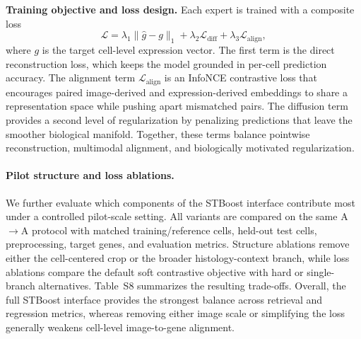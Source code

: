 \documentclass[sigconf,review]{acmart}
\begin{document}
\noindent\textbf{Training objective and loss design.}
Each expert is trained with a composite loss
\begin{equation}
\mathcal{L}=\lambda_1\|\hat{g}-g\|_1 + \lambda_2\mathcal{L}_{\mathrm{diff}} + \lambda_3\mathcal{L}_{\mathrm{align}},
\end{equation}
where $g$ is the target cell-level expression vector. The first term is the direct reconstruction loss, which keeps the model grounded in per-cell prediction accuracy. The alignment term $\mathcal{L}_{\mathrm{align}}$ is an InfoNCE contrastive loss that encourages paired image-derived and expression-derived embeddings to share a representation space while pushing apart mismatched pairs. The diffusion term provides a second level of regularization by penalizing predictions that leave the smoother biological manifold. Together, these terms balance pointwise reconstruction, multimodal alignment, and biologically motivated regularization.

\paragraph{Pilot structure and loss ablations.}
We further evaluate which components of the STBoost interface contribute most under a controlled pilot-scale setting. All variants are compared on the same A$\to$A protocol with matched training/reference cells, held-out test cells, preprocessing, target genes, and evaluation metrics. Structure ablations remove either the cell-centered crop or the broader histology-context branch, while loss ablations compare the default soft contrastive objective with hard or single-branch alternatives. Table~S8 summarizes the resulting trade-offs. Overall, the full STBoost interface provides the strongest balance across retrieval and regression metrics, whereas removing either image scale or simplifying the loss generally weakens cell-level image-to-gene alignment.
\end{document}
